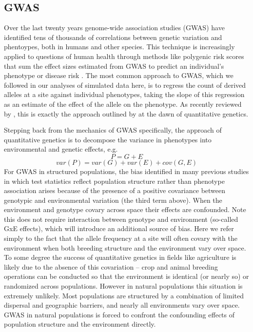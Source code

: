 \documentclass[11pt,twoside,lineno]{preprint}
\begin{document}
\subsection{GWAS}
Over the last twenty years genome-wide association studies (GWAS) have identified tens of thousands of correlations between genetic variation and phentoypes, both in humans and other species. This technique is increasingly applied to questions of human health through methods like polygenic risk scores that sum the effect sizes estimated from GWAS to predict an individual's phenotype or disease risk \citep{Khera2018}. The most common approach to GWAS, which we followed in our analyses of simulated data here, is to regress the count of derived alleles at a site against individual phenotypes, taking the slope of this regression as an estimate of the effect of the allele on the phenotype. As recently reviewed by \cite{Visscher2019}, this is exactly the approach outlined by \cite{Fisher1918} at the dawn of quantitative genetics. 

Stepping back from the mechanics of GWAS specifically, the approach of quantitative genetics is to decompose the variance in phenotypes into environmental and genetic effects, e.g. 
\begin{equation}
P=G+E
\end{equation}
\begin{equation}
var(P)=var(G)+var(E)+cov(G,E)
\end{equation}
For GWAS in structured populations, the bias identified in many previous studies \citep{Price2006,Yu2006,Young2018,Mathieson2012,Kang2008,Kang2010,Bulik-Sullivan2015} in which test statistics reflect population structure rather than phenotype association arises because of the presence of a positive covariance between genotypic and environmental variation (the third term above). When the environment and genotype covary across space their effects are confounded. Note this does not require interaction between genotype and environment (so-called GxE effects), which will introduce an additional source of bias. Here we refer simply to the fact that the allele frequency at a site will often covary with the environment when both breeding structure and the environment vary over space. To some degree the success of quantitative genetics in fields like agriculture is likely due to the absence of this covariation -- crop and animal breeding operations can be conducted so that the environment is identical (or nearly so) or randomized across populations. However in natural populations this situation is extremely unlikely. Most populations are structured by a combination of limited dispersal and geographic barriers, and nearly all environments vary over space. GWAS in natural populations is forced to confront the confounding effects of population structure and the environment directly. 
\end{document}
